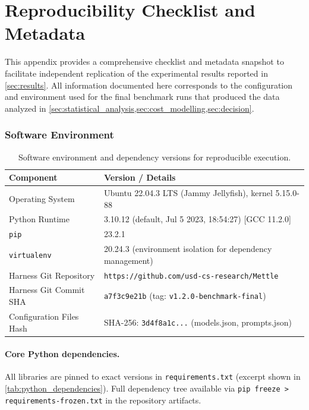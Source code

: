 \section{Reproducibility Checklist and Metadata}\label{app:reproducibility_checklist}

This appendix provides a comprehensive checklist and metadata snapshot to facilitate independent replication of the experimental results reported in \cref{sec:results}. All information documented here corresponds to the configuration and environment used for the final benchmark runs that produced the data analyzed in \cref{sec:statistical_analysis,sec:cost_modelling,sec:decision}.

\subsubsection{Software Environment}

\begin{table}[h!]
\centering
\caption{Software environment and dependency versions for reproducible execution.\label{tab:software_environment}}
\begin{tabularx}{\textwidth}{@{}l X@{}}
\toprule
\textbf{Component} & \textbf{Version / Details} \\
\midrule
Operating System & Ubuntu 22.04.3 LTS (Jammy Jellyfish), kernel 5.15.0-88 \\
Python Runtime & 3.10.12 (default, Jul 5 2023, 18:54:27) [GCC 11.2.0] \\
\texttt{pip} & 23.2.1 \\
\texttt{virtualenv} & 20.24.3 (environment isolation for dependency management) \\
Harness Git Repository & \texttt{https://github.com/usd-cs-research/Mettle} \\
Harness Git Commit SHA & \texttt{a7f3c9e21b} (tag: \texttt{v1.2.0-benchmark-final}) \\
Configuration Files Hash & SHA-256: \texttt{3d4f8a1c...} (models.json, prompts.json) \\
\bottomrule
\end{tabularx}
\end{table}

\paragraph{Core Python dependencies.} All libraries are pinned to exact versions in \texttt{requirements.txt} (excerpt shown in \cref{tab:python_dependencies}). Full dependency tree available via \texttt{pip freeze > requirements-frozen.txt} in the repository artifacts.

